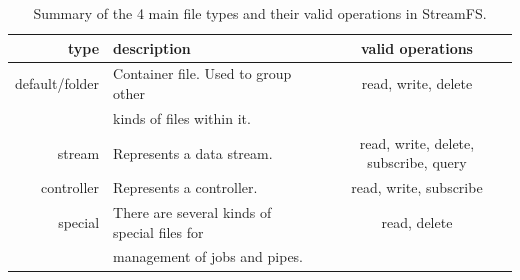 \begin{table}[h]
\begin{center}
\begin{tabular}{| r | l | c |}
	\hline
	\textbf{type} & \textbf{description} & \textbf{valid operations} \\ \hline
	default/folder & Container file.  Used to group other  & read, write, delete  \\
				   & kinds of files within it.  &  \\

	stream & Represents a data stream. & read, write, delete, subscribe, query \\

	controller & Represents a controller. & read, write, subscribe \\

	special & There are several kinds of special files for  & read, delete \\
		    & management of jobs and pipes. &  \\
	\hline
\end{tabular}
\caption{Summary of the 4 main file types and their valid operations in StreamFS.}
\label{tab:filetypes}
\end{center}
\end{table}



